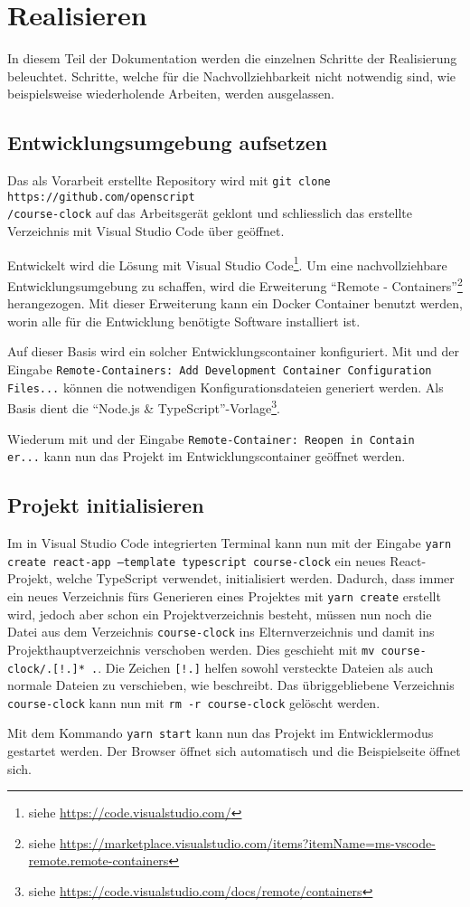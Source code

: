 \chapter{Realisieren}
In diesem Teil der Dokumentation werden die einzelnen Schritte der Realisierung beleuchtet. Schritte, welche für die Nachvollziehbarkeit nicht notwendig sind, wie beispielsweise wiederholende Arbeiten, werden ausgelassen.

\section{Entwicklungsumgebung aufsetzen}
Das als Vorarbeit erstellte Repository wird mit \texttt{git clone https://github.com/openscript\\/course-clock} auf das Arbeitsgerät geklont und schliesslich das erstellte Verzeichnis mit Visual Studio Code über  geöffnet.

Entwickelt wird die Lösung mit Visual Studio Code\footnote{siehe \url{https://code.visualstudio.com/}}. Um eine nachvollziehbare Entwicklungsumgebung zu schaffen, wird die Erweiterung \enquote{Remote - Containers}\footnote{siehe \url{https://marketplace.visualstudio.com/items?itemName=ms-vscode-remote.remote-containers}} herangezogen. Mit dieser Erweiterung kann ein Docker Container benutzt werden, worin alle für die Entwicklung benötigte Software installiert ist.

Auf dieser Basis wird ein solcher Entwicklungscontainer konfiguriert. Mit  und der Eingabe \texttt{Remote-Containers: Add Development Container Configuration Files...} können die notwendigen Konfigurationsdateien generiert werden. Als Basis dient die \enquote{Node.js \& TypeScript}-Vorlage\footnote{siehe \url{https://code.visualstudio.com/docs/remote/containers}}.

Wiederum mit  und der Eingabe \texttt{Remote-Container: Reopen in Contain\\er...} kann nun das Projekt im Entwicklungscontainer geöffnet werden.

\section{Projekt initialisieren}
Im in Visual Studio Code integrierten Terminal kann nun mit der Eingabe \texttt{yarn create react-app --template typescript course-clock} ein neues React-Projekt, welche TypeScript verwendet, initialisiert werden. Dadurch, dass immer ein neues Verzeichnis fürs Generieren eines Projektes mit \texttt{yarn create} erstellt wird, jedoch aber schon ein Projektverzeichnis besteht, müssen nun noch die Datei aus dem Verzeichnis \texttt{course-clock} ins Elternverzeichnis und damit ins Projekthauptverzeichnis verschoben werden. Dies geschieht mit \texttt{mv course-clock/.[!.]* .}. Die Zeichen \texttt{[!.]} helfen sowohl versteckte Dateien als auch normale Dateien zu verschieben, wie \cite{move_hidden_files-ask_ubuntu} beschreibt. Das übriggebliebene Verzeichnis \texttt{course-clock} kann nun mit \texttt{rm -r course-clock} gelöscht werden.

Mit dem Kommando \texttt{yarn start} kann nun das Projekt im Entwicklermodus gestartet werden. Der Browser öffnet sich automatisch und die Beispielseite öffnet sich. 
